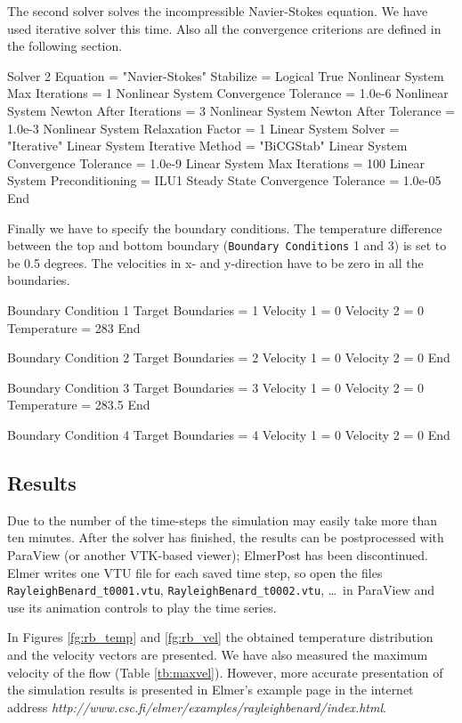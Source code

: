 \begin{flushleft}
The second solver solves the incompressible Navier-Stokes equation. We have used iterative solver this time. Also all the convergence criterions are defined in the following section.  

\ttbegin
Solver 2
 Equation = "Navier-Stokes"
 Stabilize = Logical True
 Nonlinear System Max Iterations = 1
 Nonlinear System Convergence Tolerance = 1.0e-6
 Nonlinear System Newton After Iterations = 3
 Nonlinear System Newton After Tolerance = 1.0e-3
 Nonlinear System Relaxation Factor = 1
 Linear System Solver = "Iterative"
 Linear System Iterative Method = "BiCGStab"
 Linear System Convergence Tolerance = 1.0e-9
 Linear System Max Iterations = 100
 Linear System Preconditioning = ILU1
 Steady State Convergence Tolerance = 1.0e-05
End
\ttend

Finally we have to specify the boundary conditions. The temperature difference between the top and bottom boundary ({\tt Boundary Conditions} 1 and 3) is set to be 0.5 degrees. The velocities in x- and y-direction have to be zero in all the boundaries.

\ttbegin
Boundary Condition 1
  Target Boundaries = 1
  Velocity 1 = 0
  Velocity 2 = 0
  Temperature = 283
End

Boundary Condition 2
  Target Boundaries = 2
  Velocity 1 = 0
  Velocity 2 = 0
End

Boundary Condition 3
  Target Boundaries = 3
  Velocity 1 = 0
  Velocity 2 = 0
  Temperature = 283.5
End

Boundary Condition 4
  Target Boundaries = 4
  Velocity 1 = 0
  Velocity 2 = 0
End
\ttend


\subsection*{Results}

Due to the number of the time-steps the simulation may easily take more than ten minutes.
After the solver has finished, the results can be postprocessed with ParaView
(or another VTK-based viewer); ElmerPost has been discontinued. Elmer writes
one VTU file for each saved time step, so open the files
{\tt RayleighBenard\_t0001.vtu}, {\tt RayleighBenard\_t0002.vtu}, \ldots\
in ParaView and use its animation controls to play the time series.


In Figures \ref{fg:rb_temp} and \ref{fg:rb_vel} the obtained temperature distribution and the velocity vectors are presented. We have also measured the maximum velocity of the flow (Table \ref{tb:maxvel}).
However, more accurate presentation of the simulation results is presented in Elmer's example page in the internet address
\emph{http://www.csc.fi/elmer/examples/rayleighbenard/index.html}.
\end{flushleft}

